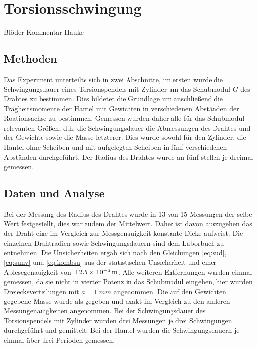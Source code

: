 
\section{Torsionsschwingung}

 Blöder Kommentar Hauke
\subsection{Methoden}
Das Experiment unterteilte sich in zwei Abschnitte, im ersten wurde die Schwingungsdauer eines Torsionspendels mit Zylinder um das Schubmodul $G$ des Drahtes zu bestimmen. Dies bildetet die Grundlage um anschließend die Trägheitsmomente der Hantel mit Gewichten in verschiedenen Abständen der Roationsachse zu bestimmen.
Gemessen wurden daher alle für das Schubmodul relevanten Größen, d.h. die Schwingungsdauer die Abmessungen des Drahtes und der Gewichte sowie die Masse letzterer. Dies wurde sowohl für den Zylinder, die Hantel ohne Scheiben und mit aufgelegten Scheiben in fünf verschiedenen Abständen durchgeführt. Der Radius des Drahtes wurde an fünf stellen je dreimal gemessen.


\subsection{Daten und Analyse}
 Bei der Messung des Radius des Drahtes wurde in 13 von 15 Messungen der selbe Wert festgestellt, dies war zudem der Mittelwert. Daher ist davon auszugehen das der Draht eine im Vergleich zur Messgenauigkeit konstante Dicke aufweist. Die einzelnen Drahtradien sowie Schwingungsdauern sind dem Laborbuch zu entnehmen. Die Unsicherheiten ergab sich nach den Gleichungen \ref{eq:sud}, \ref{eq:sunv} und \ref{eq:kombsu} aus der statistischen Unsicherheit und einer Ablesegenauigkeit von $\SI{\pm 2.5e-6}{m}$.
 Alle weiteren Entfernungen wurden einmal gemessen, da sie nicht in vierter Potenz in das Schubmodul eingehen, hier wurden Dreiecksverteilungen mit $a=\SI{1}{mm}$ angenommen. Die auf den Gewichten gegebene Masse wurde als gegeben und exakt im Vergleich zu den anderen Messungenauigkeiten angenommen. Bei der Schwingungsdauer des Torsionspendels mit Zylinder wurden drei Messungen je drei Schwingungen durchgeführt und gemittelt. Bei der Hantel wurden die Schwingungsdauern je einmal über drei Perioden gemessen.\\
 
 
